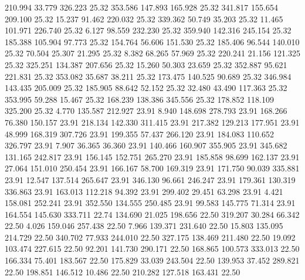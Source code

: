  210.994   33.779  326.223        25.32
 353.586  147.893  165.928        25.32
 341.817  155.654  209.100        25.32
  15.237   91.462  220.032        25.32
 339.362   50.749   35.203        25.32
  11.465  101.971  226.740        25.32
   6.127   98.559  232.230        25.32
 359.940  142.316  245.154        25.32
 185.388  105.904   97.773        25.32
 154.764   56.606  151.530        25.32
 185.406   96.544  140.010        25.32
  70.504   25.307   21.295        25.32
   8.382   68.265   57.969        25.32
 220.241   21.156  121.325        25.32
 325.251  134.387  207.656        25.32
  15.260   50.303   23.659        25.32
 352.887   95.621  221.831        25.32
 353.082   35.687   38.211        25.32
 173.475  140.525   90.689        25.32
 346.984  143.435  205.009        25.32
 185.905   88.642   52.152        25.32
  32.480   43.490  117.363        25.32
 353.995   59.288   15.467        25.32
 168.239  138.386  345.556        25.32
 178.852  118.109  325.200        25.32
   4.770  135.587  212.927        23.91
   8.940  148.698  278.793        23.91
 168.266   76.380  150.157        23.91
 218.134  142.330  311.415        23.91
 217.382  129.213  177.951        23.91
  48.999  168.319  307.726        23.91
 199.355   57.437  266.120        23.91
 184.083  110.652  326.797        23.91
   7.907   36.365   36.360        23.91
 140.466  160.907  355.905        23.91
 345.682  131.165  242.817        23.91
 156.145  152.751  265.270        23.91
 185.858   98.699  162.137        23.91
  27.064  151.010  250.454        23.91
 166.167   58.700  169.319        23.91
 171.750   90.039  335.881        23.91
  12.547  137.514  265.647        23.91
 346.130   96.661  246.247        23.91
 179.361  130.319  336.863        23.91
 163.013  112.218   94.392        23.91
 299.402   29.451   63.298        23.91
   4.421  158.081  252.241        23.91
 352.550  134.555  250.485        23.91
  99.583  145.775   71.314        23.91
 164.554  145.630  333.711        22.74
 134.690   21.025  198.656        22.50
 319.207   30.284   66.342        22.50
   4.026  159.046  257.438        22.50
   7.966  139.371  231.640        22.50
  15.803  135.095  214.729        22.50
 340.702   77.933  244.010        22.50
 327.175  138.469  211.480        22.50
  19.092  103.474  227.615        22.50
  92.201  141.730  290.171        22.50
 168.865  100.573  333.013        22.50
 166.334   75.401  183.567        22.50
 175.829   33.039  243.504        22.50
 139.953   37.452  289.821        22.50
 198.851  146.512   10.486        22.50
 210.282  127.518  163.431        22.50
